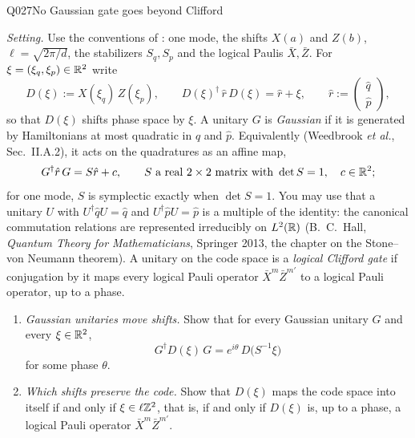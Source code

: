 \begin{entry}{Q027}{No Gaussian gate goes beyond Clifford}
\begin{problem}
\emph{Setting.} Use the conventions of : one mode, the shifts $X(a)$ and $Z(b)$,
$\ell=\sqrt{2\pi/d}$, the stabilizers $S_q,S_p$ and the logical Paulis $\bar X,\bar Z$. For
$\xi=(\xi_q,\xi_p)\in\mathbb{R}^2$ write
\begin{equation}
  D(\xi):=X(\xi_q)\,Z(\xi_p),\qquad D(\xi)^\dagger\,\hat r\,D(\xi)=\hat r+\xi,\qquad
  \hat r:=\begin{pmatrix}\hat q\\ \hat p\end{pmatrix},
  \label{q026:shift}
\end{equation}
so that $D(\xi)$ shifts phase space by $\xi$. A unitary $G$ is \emph{Gaussian} if it is
generated by Hamiltonians at most quadratic in $\hat q$ and $\hat p$. Equivalently (Weedbrook
\emph{et al.}, Sec.~II.A.2), it acts on the quadratures as an affine map,
\begin{equation}
  G^\dagger\hat r\,G=S\hat r+c,\qquad
  S\ \text{a real }2\times2\text{ matrix with }\det S=1,\quad c\in\mathbb{R}^{2};
  \label{q026:gaussian}
\end{equation}
for one mode, $S$ is symplectic exactly when $\det S=1$. You may use that a unitary $U$ with
$U^\dagger\hat qU=\hat q$ and $U^\dagger\hat pU=\hat p$ is a multiple of the identity: the
canonical commutation relations are represented irreducibly on $L^2(\mathbb{R})$ (B.~C.~Hall,
\emph{Quantum Theory for Mathematicians}, Springer 2013, the chapter on the Stone--von
Neumann theorem). A unitary on the code space is a \emph{logical Clifford gate} if
conjugation by it maps every logical Pauli operator $\bar X^{m}\bar Z^{m'}$ to a logical
Pauli operator, up to a phase.

\begin{enumerate}[label=\textbf{(\alph*)},leftmargin=*]
  \item \emph{Gaussian unitaries move shifts.} Show that for every Gaussian unitary $G$
        and every $\xi\in\mathbb{R}^{2}$,
        \begin{equation}
          G^\dagger D(\xi)\,G=e^{i\theta}\,D\bigl(S^{-1}\xi\bigr)
          \label{q026:conjugation}
        \end{equation}
        for some phase $\theta$.

  \item \emph{Which shifts preserve the code.} Show that $D(\xi)$ maps the code space into
        itself if and only if $\xi\in\ell\mathbb{Z}^{2}$, that is, if and only if $D(\xi)$ is, up to
        a phase, a logical Pauli operator $\bar X^{m}\bar Z^{m'}$.


\end{enumerate}
\end{problem}
\end{entry}
